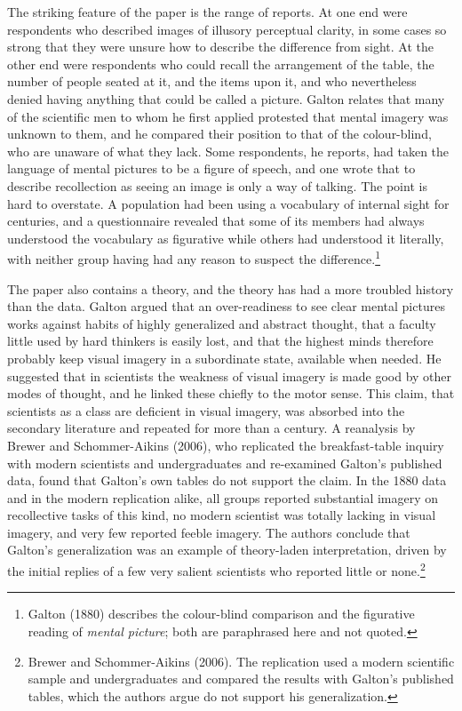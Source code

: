 \documentclass[11pt]{article}
\theoremstyle{remark}
\begin{document}
The striking feature of the paper is the range of reports. At one end were respondents who described images of illusory perceptual clarity, in some cases so strong that they were unsure how to describe the difference from sight. At the other end were respondents who could recall the arrangement of the table, the number of people seated at it, and the items upon it, and who nevertheless denied having anything that could be called a picture. Galton relates that many of the scientific men to whom he first applied protested that mental imagery was unknown to them, and he compared their position to that of the colour-blind, who are unaware of what they lack. Some respondents, he reports, had taken the language of mental pictures to be a figure of speech, and one wrote that to describe recollection as seeing an image is only a way of talking. The point is hard to overstate. A population had been using a vocabulary of internal sight for centuries, and a questionnaire revealed that some of its members had always understood the vocabulary as figurative while others had understood it literally, with neither group having had any reason to suspect the difference.\footnote{Galton (1880) describes the colour-blind comparison and the figurative reading of \emph{mental picture}; both are paraphrased here and not quoted.}

The paper also contains a theory, and the theory has had a more troubled history than the data. Galton argued that an over-readiness to see clear mental pictures works against habits of highly generalized and abstract thought, that a faculty little used by hard thinkers is easily lost, and that the highest minds therefore probably keep visual imagery in a subordinate state, available when needed. He suggested that in scientists the weakness of visual imagery is made good by other modes of thought, and he linked these chiefly to the motor sense. This claim, that scientists as a class are deficient in visual imagery, was absorbed into the secondary literature and repeated for more than a century. A reanalysis by Brewer and Schommer-Aikins (2006), who replicated the breakfast-table inquiry with modern scientists and undergraduates and re-examined Galton's published data, found that Galton's own tables do not support the claim. In the 1880 data and in the modern replication alike, all groups reported substantial imagery on recollective tasks of this kind, no modern scientist was totally lacking in visual imagery, and very few reported feeble imagery. The authors conclude that Galton's generalization was an example of theory-laden interpretation, driven by the initial replies of a few very salient scientists who reported little or none.\footnote{Brewer and Schommer-Aikins (2006). The replication used a modern scientific sample and undergraduates and compared the results with Galton's published tables, which the authors argue do not support his generalization.}
\end{document}

